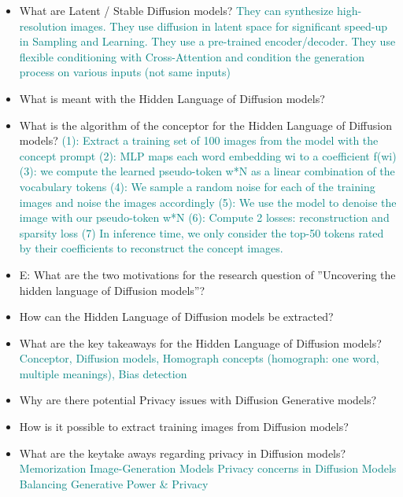 \documentclass{report}
\newcommand{\asw}[2][teal]{}
\renewcommand{\asw}[2][teal]{\textcolor{#1}{#2}}
\begin{document}
\begin{itemize}
		\asw{\newline }
		\item What are Latent / Stable Diffusion models?
		\asw{\newline They can synthesize high-resolution images. They use diffusion in latent space for significant speed-up in Sampling and Learning. They use a pre-trained encoder/decoder. They use flexible conditioning with Cross-Attention and condition the generation process on various inputs (not same inputs)}
		\item What is meant with the Hidden Language of Diffusion models?
		\asw{\newline }
		\item What is the algorithm of the conceptor for the Hidden Language of Diffusion models?
		\asw{\newline (1): Extract a training set of 100 images from the model with the concept prompt
			\newline (2): MLP maps each word embedding wi to a coefficient f(wi)
			\newline (3): we compute the learned pseudo-token w*N as a linear combination of the vocabulary tokens
			\newline (4): We sample a random noise for each of the training images and noise the images accordingly
			\newline (5): We use the model to denoise the image with our pseudo-token w*N
			\newline (6): Compute 2 losses: reconstruction and sparsity loss
			\newline (7) In inference time, we only consider the top-50 tokens rated by their coefficients to reconstruct the concept images.}
		\item E: What are the two motivations for the research question of ”Uncovering the hidden language of Diffusion models”?
		\asw{\newline }
		\item How can the Hidden Language of Diffusion models be extracted?
		\asw{\newline }
		\item What are the key takeaways for the Hidden Language of Diffusion models?
		\asw{\newline Conceptor, Diffusion models, Homograph concepts (homograph: one word, multiple meanings), Bias detection}
		\item Why are there potential Privacy issues with Diffusion Generative models?
		\asw{\newline }
		\item How is it possible to extract training images from Diffusion models?
		\asw{\newline }
		\item What are the keytake aways regarding privacy in Diffusion models?
		\asw{\newline Memorization Image-Generation Models
			\newline Privacy concerns in Diffusion Models
			\newline Balancing Generative Power \& Privacy}
		
	\end{itemize}
	\newpage
\end{document}
